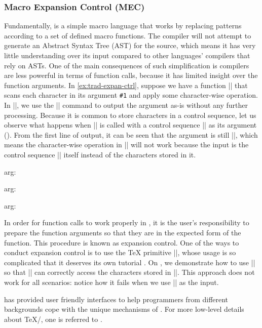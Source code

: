 \subsubsection{Macro Expansion Control (MEC)}\label{sec:intro-macro-expansion-control}
Fundamentally, \LT{} is a simple macro language that works by replacing patterns according to a set of defined macro functions.
The \LT{} compiler will not attempt to generate an Abstract Syntax Tree (AST) for the \LT{} source, which means it has very little understanding over its input compared to other languages' compilers that rely on ASTs.
One of the main consequences of such simplification is \LT{} compilers are less powerful in terms of function calls, because it has limited insight over the function arguments.
In \cref{ex:trad-expan-ctrl}, suppose we have a function \inltex|\cmda| that scans each character in its argument \verb|#1| and apply some character-wise operation. 
In \inltex|\cmda|, we use the \inltex|\detokenize| command to output the argument as-is without any further processing.
Because it is common to store characters in a control sequence, let us observe what happens when \inltex|\cmda| is called with a control sequence \inltex|\vala| as its argument ().
From the first line of output, it can be seen that the argument is still \inltex|\vala|, which means the character-wise operation in \inltex|\cmda| will not work because the input is the control sequence \inltex|\cmda| itself instead of the characters stored in it.
\begin{latexsample}[examplelabel=ex:trad-expan-ctrl,exampletitle={Expansion Control},noexport]
\def\cmda#1{%
  arg: \detokenize{#1} %
}
\def\vala{val-a}
\def\valb{\vala}
\par\cmda{\vala}
\par\expandafter\expandafter\expandafter\cmda\expandafter{\vala}
\par\expandafter\expandafter\expandafter\cmda\expandafter{\valb}
\end{latexsample}
\noindent In order for function calls to work properly in \LT{}, it is the user's responsibility to prepare the function arguments so that they are in the expected form of the function.
This procedure is known as expansion control.
One of the ways to conduct expansion control is to use the \TeX{} primitive \inltex|\expandafter|, whose usage is so complicated that it deserves its own tutorial \cite{bechtolsheim1988tutorial}.
On , we demonstrate how to use \inltex|\expandafter| so that \inltex|\cmda| can correctly access the characters stored in \inltex|\vala|.
This approach does not work for all scenarios: notice how it fails when we use \inltex|\valb| as the input.

\LTT{} has provided user friendly interfaces to help \LT{} programmers from different backgrounds cope with the unique mechanisms of \LT{}.
For more low-level details about \TeX{}/\LT{}, one is referred to \cite{knuth1984texbook,berry2017latex}.

